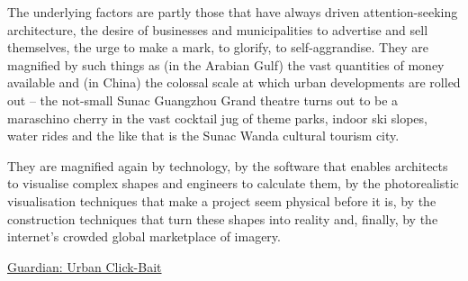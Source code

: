 \documentclass[
]{book}
\begin{document}
The underlying factors are partly those that have always driven attention-seeking architecture, the desire of businesses and municipalities to advertise and sell themselves, the urge to make a mark, to glorify, to self-aggrandise. They are magnified by such things as (in the Arabian Gulf) the vast quantities of money available and (in China) the colossal scale at which urban developments are rolled out -- the not-small Sunac Guangzhou Grand theatre turns out to be a maraschino cherry in the vast cocktail jug of theme parks, indoor ski slopes, water rides and the like that is the Sunac Wanda cultural tourism city.

They are magnified again by technology, by the software that enables architects to visualise complex shapes and engineers to calculate them, by the photorealistic visualisation techniques that make a project seem physical before it is, by the construction techniques that turn these shapes into reality and, finally, by the internet's crowded global marketplace of imagery.

\href{https://www.theguardian.com/artanddesign/2021/jan/24/urban-clickbait-why-iconic-architecture-is-all-the-rage-again}{Guardian: Urban Click-Bait}

  
\end{document}
